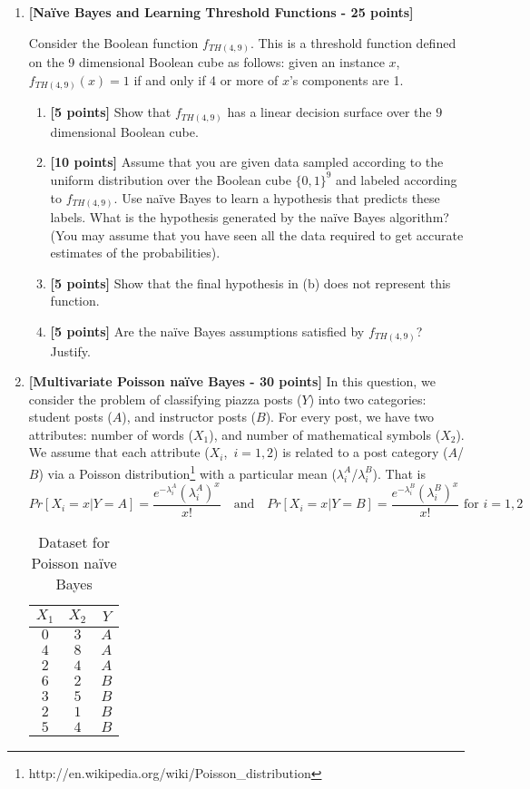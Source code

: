\begin{enumerate}
\item {\bf [Na\"ive Bayes and Learning Threshold Functions - 25 points]}

Consider the Boolean function $f_{TH(4,9)}$.  This is a threshold function
defined on the 9 dimensional Boolean cube as follows: given an instance $x$,
$f_{TH(4,9)}(x) = 1$ if and only if 4 or more of $x$'s components are 1.
\begin{enumerate}
\item {\bf [5 points]} Show that $f_{TH(4,9)}$ has a linear decision surface over the 
$9$ dimensional Boolean cube.
\item {\bf [10 points]}
Assume that you are given data sampled according to the uniform distribution
over the Boolean cube $\{0, 1\}^9$ and labeled according to $f_{TH(4,9)}$.
Use na\"ive Bayes to learn a hypothesis that predicts these labels.  What is
the hypothesis generated by the na\"ive Bayes algorithm?  (You may assume that
you have seen all the data required to get accurate estimates of the
probabilities).
\item {\bf [5 points]}
Show that the final hypothesis in (b) does not represent this function.
\item {\bf [5 points]}
Are the na\"ive Bayes assumptions satisfied by $f_{TH(4,9)}$?  Justify.
\end{enumerate}

\item {\bf [Multivariate Poisson na\"ive Bayes - 30 points]}
In this question, we consider the problem of classifying piazza posts ($Y$) into two categories: student posts ($A$), and instructor posts ($B$). For every post, we have two attributes: number of words ($X_1$), and number of mathematical symbols ($X_2$). We assume that each attribute ($X_i$,\ $i=1,2$) is related to a post category ($A$/$B$) via a Poisson distribution\footnote{http://en.wikipedia.org/wiki/Poisson\_distribution} with a particular mean ($\lambda^A_i$/$\lambda^B_i$). That is 
\[ Pr[X_i=x | Y = A] = \frac{e^{-\lambda^A_i} (\lambda^A_i)^x }{x!} ~~~\text{ and } ~~~ Pr[X_i=x | Y = B] = \frac{e^{-\lambda^B_i} (\lambda^B_i)^x }{x!} \text{ for } i =1,2 \]

\begin{table}[!h]
\begin{center}
\begin{tabular}{|c|c|c|}
\hline
$X_1$ & $X_2$ & $Y$ \\
\hline
$0$ & $3$ & $A$ \\
$4$ & $8$ & $A$ \\
$2$ & $4$ & $A$ \\
$6$ & $2$ & $B$ \\
$3$ & $5$ & $B$ \\
$2$ & $1$ & $B$ \\
$5$ & $4$ & $B$ \\
\hline
\end{tabular}
\caption{Dataset for Poisson na\"ive Bayes}
\label{tab:p1}
\end{center}
\end{table}


\end{enumerate}
